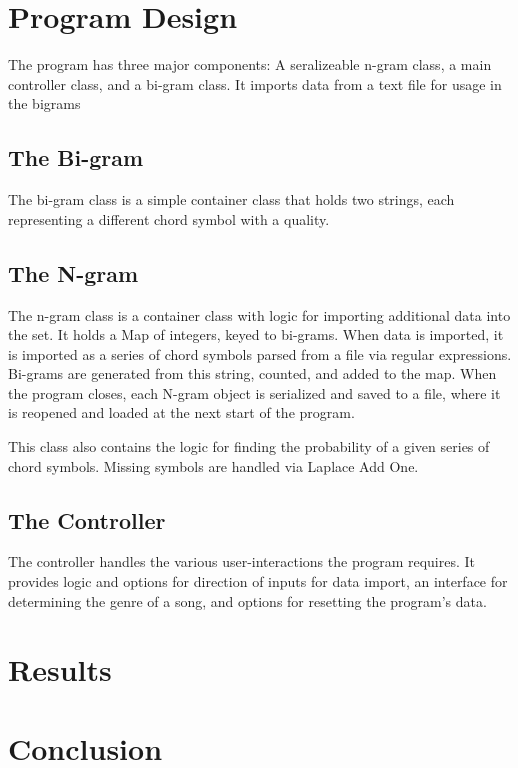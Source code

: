\documentclass{article}
\begin{document}
\newpage

\section{Program Design}
The program has three major components:  A seralizeable n-gram class,
a main controller class, and a bi-gram class.  It imports data from a text 
file for usage in the bigrams %

	\subsection{The Bi-gram}
	The bi-gram class is a simple container class that holds two strings, each 
	representing a different chord symbol with a quality.


		\subsection{The N-gram}
		The n-gram class is a container class with logic for importing additional 
		data into the set.  It holds a Map of integers, keyed to bi-grams.  When 
		data is imported, it is imported as a series of chord symbols parsed 
		from a file via regular expressions.  Bi-grams are generated from this 
		string, counted, and added to the map.  When the program closes, each 
		N-gram object is serialized and saved to a file, where it is reopened and 
		loaded at the next start of the program.

		This class also contains the logic for finding the probability of a given 
		series of chord symbols.  Missing symbols are handled via Laplace Add One.

	\subsection{The Controller}
	The controller handles the various user-interactions the program requires.  
	It provides logic and options for direction of inputs for data import, an 
	interface for determining the genre of a song, and options for resetting 
	the program's data.

\newpage

\section{Results}

\newpage

\section{Conclusion}
\end{document}
